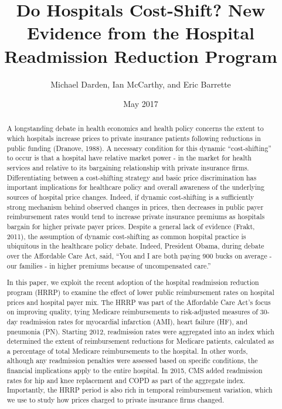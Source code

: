 \documentclass[11pt]{article}
\title{Do Hospitals Cost-Shift? New Evidence from the Hospital Readmission Reduction Program}
\author{Michael Darden, Ian McCarthy, and Eric Barrette}
\date{May 2017 \vspace{-2ex}}
\begin{document}
\maketitle

\begin{abstract}
A longstanding debate in health economics and health policy concerns the extent to which hospitals increase prices to private insurance patients following reductions in public funding (Dranove, 1988).  A necessary condition for this dynamic ``cost-shifting'' to occur is that a hospital have relative market power - in the market for health services and relative to its bargaining relationship with private insurance firms.  Differentiating between a cost-shifting strategy and basic price discrimination has important implications for healthcare policy and overall awareness of the underlying sources of hospital price changes. Indeed, if dynamic cost-shifting is a sufficiently strong mechanism behind observed changes in prices, then decreases in public payer reimbursement rates would tend to increase private insurance premiums as hospitals bargain for higher private payer prices.  Despite a general lack of evidence (Frakt, 2011), the assumption of dynamic cost-shifting as common hospital practice is ubiquitous in the healthcare policy debate.  Indeed, President Obama, during debate over the Affordable Care Act, said, ``You and I are both paying 900 bucks on average - our families - in higher premiums because of uncompensated care.''

In this paper, we exploit the recent adoption of the hospital readmission reduction program (HRRP) to examine the effect of lower public reimbursement rates on hospital prices and hospital payer mix.  The HRRP was part of the Affordable Care Act's focus on improving quality, tying Medicare reimbursements to risk-adjusted measures of 30-day readmission rates for myocardial infarction (AMI), heart failure (HF), and pneumonia (PN).  Starting 2012, readmission rates were aggregated into an index which determined the extent of reimbursement reductions for Medicare patients, calculated as a percentage of total Medicare reimbursements to the hospital. In other words, although any readmission penalties were assessed based on specific conditions, the financial implications apply to the entire hospital. In 2015, CMS added readmission rates for hip and knee replacement and COPD as part of the aggregate index.  Importantly, the HRRP period is also rich in temporal reimbursement variation, which we use to study how prices charged to private insurance firms changed.


\end{abstract}
\end{document}
